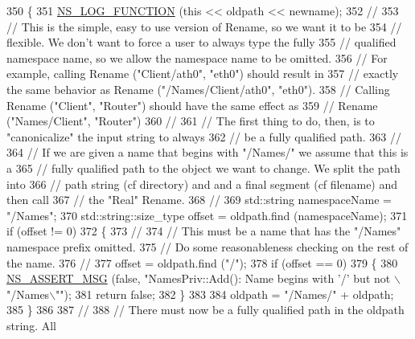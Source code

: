 \begin{DoxyCode}
350 \{
351   \hyperlink{log-macros-disabled_8h_a90b90d5bad1f39cb1b64923ea94c0761}{NS\_LOG\_FUNCTION} (\textcolor{keyword}{this} << oldpath << newname);
352   \textcolor{comment}{//}
353   \textcolor{comment}{// This is the simple, easy to use version of Rename, so we want it to be }
354   \textcolor{comment}{// flexible.   We don't want to force a user to always type the fully }
355   \textcolor{comment}{// qualified namespace name, so we allow the namespace name to be omitted.}
356   \textcolor{comment}{// For example, calling Rename ("Client/ath0", "eth0") should result in }
357   \textcolor{comment}{// exactly the same behavior as Rename ("/Names/Client/ath0", "eth0").}
358   \textcolor{comment}{// Calling Rename ("Client", "Router") should have the same effect as }
359   \textcolor{comment}{// Rename ("Names/Client", "Router")}
360   \textcolor{comment}{//}
361   \textcolor{comment}{// The first thing to do, then, is to "canonicalize" the input string to always}
362   \textcolor{comment}{// be a fully qualified path.}
363   \textcolor{comment}{//}
364   \textcolor{comment}{// If we are given a name that begins with "/Names/" we assume that this is a}
365   \textcolor{comment}{// fully qualified path to the object we want to change.  We split the path into }
366   \textcolor{comment}{// path string (cf directory) and and a final segment (cf filename) and then call}
367   \textcolor{comment}{// the "Real" Rename.}
368   \textcolor{comment}{//}
369   std::string namespaceName = \textcolor{stringliteral}{"/Names"};
370   std::string::size\_type offset = oldpath.find (namespaceName);
371   \textcolor{keywordflow}{if} (offset != 0)
372     \{
373       \textcolor{comment}{//}
374       \textcolor{comment}{// This must be a name that has the "/Names" namespace prefix omitted.}
375       \textcolor{comment}{// Do some reasonableness checking on the rest of the name.}
376       \textcolor{comment}{//}
377       offset = oldpath.find (\textcolor{stringliteral}{"/"});
378       \textcolor{keywordflow}{if} (offset == 0)
379         \{
380           \hyperlink{assert_8h_aff5ece9066c74e681e74999856f08539}{NS\_ASSERT\_MSG} (\textcolor{keyword}{false}, \textcolor{stringliteral}{"NamesPriv::Add(): Name begins with '/' but not \(\backslash\)"/Names\(\backslash\)""});
381           \textcolor{keywordflow}{return} \textcolor{keyword}{false};
382         \}
383 
384       oldpath = \textcolor{stringliteral}{"/Names/"} + oldpath;
385     \}
386 
387   \textcolor{comment}{//}
388   \textcolor{comment}{// There must now be a fully qualified path in the oldpath string.  All }

\end{DoxyCode}

